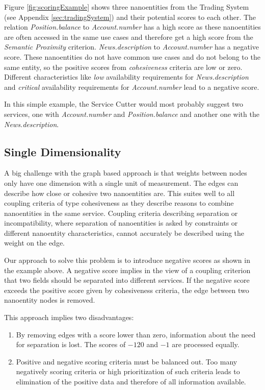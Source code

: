 Figure \ref{fig:scoringExample} shows three nanoentities from the Trading System (see Appendix \ref{sec:tradingSystem}) and their potential scores to each other. The relation \textit{Position.balance} to \textit{Account.number} has a high score as these nanoentities are often accessed in the same use cases and therefore get a high score from the \textit{Semantic Proximity} criterion. \textit{News.description} to \textit{Account.number} has a negative score. These nanoentities do not have common use cases and do not belong to the same entity, so the positive scores from \textit{cohesiveness} criteria are low or zero. Different characteristics like \textit{low} availability requirements for \textit{News.description} and \textit{critical} availability requirements for \textit{Account.number} lead to a negative score. 

In this simple example, the Service Cutter would most probably suggest two services, one with \textit{Account.number} and \textit{Position.balance} and another one with the \textit{News.description}.

\subsection{Single Dimensionality}
\label{subsec:singleDimensionality}

A big challenge with the graph based approach is that weights between nodes only have one dimension with a single unit of measurement. The edges can describe how close or cohesive two nanoentities are. This suites well to all coupling criteria of type cohesiveness as they describe reasons to combine nanoentities in the same service. Coupling criteria describing separation or incompatibility, where separation of nanoentities is asked by constraints or different nanoentity characteristics, cannot accurately be described using the weight on the edge.

Our approach to solve this problem is to introduce negative scores as shown in the example above. A negative score implies in the view of a coupling criterion that two fields should be separated into different services. If the negative score exceeds the positive score given by cohesiveness criteria, the edge between two nanoentity nodes is removed. 

This approach implies two disadvantages:

\begin{enumerate}
	\item By removing edges with a score lower than zero, information  about the need for separation is lost. The scores of $-120$ and $-1$ are processed equally. 
	\item Positive and negative scoring criteria must be balanced out. Too many negatively scoring criteria or high prioritization of such criteria leads to elimination of the positive data and therefore of all information available. 
\end{enumerate}


